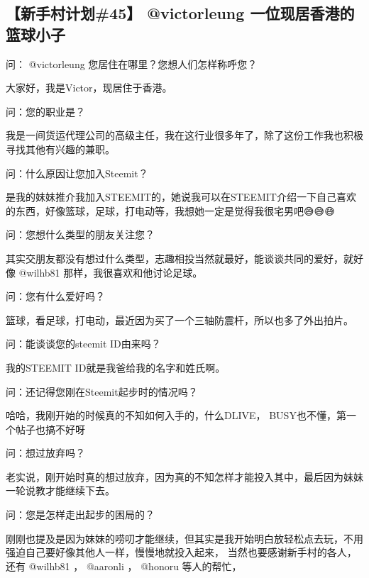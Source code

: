 \documentclass[]{ctexbook}
\begin{document}
\hypertarget{45-victorleung-}{%
\subsection{【新手村计划\#45】 @victorleung 一位现居香港的篮球小子}\label{45-victorleung-}}

问： @victorleung 您居住在哪里？您想人们怎样称呼您？

大家好，我是Victor，现居住于香港。

问：您的职业是？

我是一间货运代理公司的高级主任，我在这行业很多年了，除了这份工作我也积极寻找其他有兴趣的兼职。

问：什么原因让您加入Steemit？

是我的妹妹推介我加入STEEMIT的，她说我可以在STEEMIT介绍一下自己喜欢的东西，好像篮球，足球，打电动等，我想她一定是觉得我很宅男吧😅😅😅

问：您想什么类型的朋友关注您？

其实交朋友都没有想过什么类型，志趣相投当然就最好，能谈谈共同的爱好，就好像 @wilhb81 那样，我很喜欢和他讨论足球。

问：您有什么爱好吗？

篮球，看足球，打电动，最近因为买了一个三轴防震杆，所以也多了外出拍片。

问：能谈谈您的steemit ID由来吗？

我的STEEMIT ID就是我爸给我的名字和姓氏啊。

问：还记得您刚在Steemit起步时的情况吗？

哈哈，我刚开始的时候真的不知如何入手的，什么DLIVE， BUSY也不懂，第一个帖子也搞不好呀

问：想过放弃吗？

老实说，刚开始时真的想过放弃，因为真的不知怎样才能投入其中，最后因为妹妹一轮说教才能继续下去。

问：您是怎样走出起步的困局的？

刚刚也提及是因为妹妹的唠叨才能继续，但其实是我开始明白放轻松点去玩，不用强迫自己要好像其他人一样，慢慢地就投入起来， 当然也要感谢新手村的各人，还有 @wilhb81 ， @aaronli ， @honoru 等人的帮忙，
\end{document}
